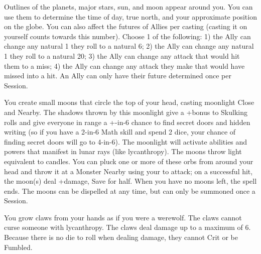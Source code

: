 {Outlines of the planets, major stars, sun, and moon appear around you. You can use them to determine the time of day, true north, and your approximate position on the globe. You can also affect the futures of \DICE Allies per casting (casting it on yourself counts towards this number). Choose 1 of the following:  1)  the Ally can change any natural 1 they roll to a natural 6; 2) the Ally can change any natural 1 they roll to a natural 20; 3) the Ally can change any attack that would hit them to a miss; 4) the Ally can change any attack they make that would have missed into a hit.  An Ally can only have their future determined once per Session.

\LITURGY [
  Name= Children of Shul,
  Link=shul-liturgy-children-of-shul,
  Paradigm= Prophesy ,
  Save=  Y (half) ,
  Duration= Session ,
  Counter=  n/a  ,
  Keywords= None ,
  Target=   Self
]



You create \DICE small moons that circle the top of your head, casting moonlight Close and Nearby.  The shadows thrown by this moonlight give a +\DICE bonus to Skulking rolls and give everyone in range a +\DICE-in-6 chance to find secret doors and hidden writing (so if you have a 2-in-6 Math skill and spend 2 dice, your chance of finding secret doors will go to 4-in-6). The moonlight will activate abilities and powers that manifest in lunar rays (like lycanthropy).  The moons throw light equivalent to \DICE candles.
You can pluck one or more of these orbs from around your head and throw it at a Monster Nearby using your \FOC to attack; on a successful hit, the moon(s) deal \SUMDICE+\DICE damage, Save for half.  When you have no moons left, the spell ends.
The moons can be dispelled at any time, but can only be summoned once a Session.

\LITURGY [
  Name= Claws of the Lycanthrope,
  Link=shul-liturgy-claws-lycanthrope,
  Paradigm= Biomancy ,
  Save=  N ,
  Duration= Session ,
  Counter=  n/a  ,
  Keywords= None ,
  Target=   Self
]



You grow claws from your hands as if you were a werewolf.  The claws cannot curse someone with lycanthropy.  The claws deal \DICE damage up to a maximum of 6. Because there is no die to roll when dealing damage, they cannot Crit or be Fumbled. 

\LITURGY [
  Name= Lunacy,
  Link=shul-liturgy-lunacy,
  Paradigm= Mind ,
  Save=  Y (negates) ,
  Duration= Markovian ,
  Counter=  n/a  ,
  Keywords= Splittable ,
  Target=   \DICE Close or Nearby creatures
]



}
